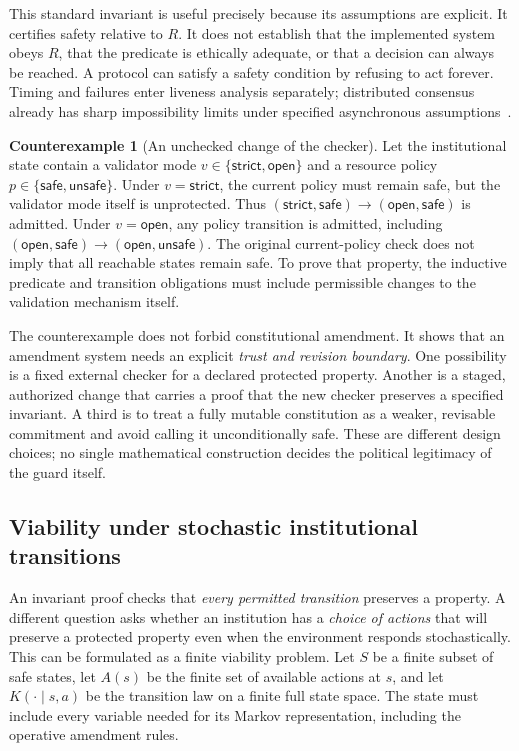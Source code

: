 \documentclass[11pt,letterpaper]{article}
\theoremstyle{plain}
\theoremstyle{definition}
\newtheorem{counterexample}[proposition]{Counterexample}
\theoremstyle{remark}
\begin{document}
This standard invariant is useful precisely because its assumptions are explicit. It certifies safety relative to $R$. It does not establish that the implemented system obeys $R$, that the predicate is ethically adequate, or that a decision can always be reached. A protocol can satisfy a safety condition by refusing to act forever. Timing and failures enter liveness analysis separately; distributed consensus already has sharp impossibility limits under specified asynchronous assumptions~\cite{flp}.

\begin{counterexample}[An unchecked change of the checker]\label{ex:checker}
Let the institutional state contain a validator mode $v\in\{\mathsf{strict},\mathsf{open}\}$ and a resource policy $p\in\{\mathsf{safe},\mathsf{unsafe}\}$. Under $v=\mathsf{strict}$, the current policy must remain safe, but the validator mode itself is unprotected. Thus $(\mathsf{strict},\mathsf{safe})\to(\mathsf{open},\mathsf{safe})$ is admitted. Under $v=\mathsf{open}$, any policy transition is admitted, including $(\mathsf{open},\mathsf{safe})\to(\mathsf{open},\mathsf{unsafe})$. The original current-policy check does not imply that all reachable states remain safe. To prove that property, the inductive predicate and transition obligations must include permissible changes to the validation mechanism itself.
\end{counterexample}

The counterexample does not forbid constitutional amendment. It shows that an amendment system needs an explicit \emph{trust and revision boundary}. One possibility is a fixed external checker for a declared protected property. Another is a staged, authorized change that carries a proof that the new checker preserves a specified invariant. A third is to treat a fully mutable constitution as a weaker, revisable commitment and avoid calling it unconditionally safe. These are different design choices; no single mathematical construction decides the political legitimacy of the guard itself.

\subsection{Viability under stochastic institutional transitions}

An invariant proof checks that \emph{every permitted transition} preserves a property. A different question asks whether an institution has a \emph{choice of actions} that will preserve a protected property even when the environment responds stochastically. This can be formulated as a finite viability problem. Let $S$ be a finite subset of safe states, let $A(s)$ be the finite set of available actions at $s$, and let $K(\cdot\mid s,a)$ be the transition law on a finite full state space. The state must include every variable needed for its Markov representation, including the operative amendment rules.
\end{document}
